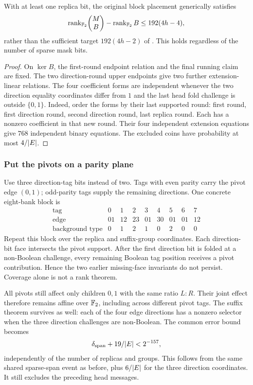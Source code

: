 \begin{proposition}
With at least one replica bit, the original block placement generically satisfies
\[
 \operatorname{rank}_{\mathbb{F}_2}\!\begin{pmatrix}M\\B\end{pmatrix}
 -\operatorname{rank}_{\mathbb{F}_2}B
 \le192(4h-4),
\]
rather than the sufficient target $192(4h-2)$ of . This holds regardless of the number of sparse mask bits.
\end{proposition}
\begin{proof}
On $\ker B$, the first-round endpoint relation and the final running claim are fixed. The two direction-round upper endpoints give two further extension-linear relations. The four coefficient forms are independent whenever the two direction equality coordinates differ from $1$ and the last head fold challenge is outside $\{0,1\}$. Indeed, order the forms by their last supported round: first round, first direction round, second direction round, last replica round. Each has a nonzero coefficient in that new round. Their four independent extension equations give $768$ independent binary equations. The excluded coins have probability at most $4/|E|$.
\end{proof}

\subsubsection{Put the pivots on a parity plane}

Use three direction-tag bits instead of two. Tags with even parity carry the pivot edge $(0,1)$; odd-parity tags supply the remaining directions. One concrete eight-bank block is
\[
\begin{array}{c|rrrrrrrr}
\text{tag}&0&1&2&3&4&5&6&7\\
\hline
\text{edge}&01&12&23&01&30&01&01&12\\
\text{background type}&0&1&2&1&0&2&0&0
\end{array}
\]
Repeat this block over the replica and suffix-group coordinates. Each direction-bit face intersects the pivot support. After the first direction bit is folded at a non-Boolean challenge, every remaining Boolean tag position receives a pivot contribution. Hence the two earlier missing-face invariants do not persist. Coverage alone is not a rank theorem.

All pivots still affect only children $0,1$ with the same ratio $L:R$. Their joint effect therefore remains affine over $\mathbb{F}_2$, including across different pivot tags. The suffix theorem survives as well: each of the four edge directions has a nonzero selector when the three direction challenges are non-Boolean. The common error bound becomes
\[
 \delta_{\mathrm{span}}+19/|E|<2^{-157},
\]
independently of the number of replicas and groups. This follows from the same shared sparse-span event as before, plus $6/|E|$ for the three direction coordinates. It still excludes the preceding head messages.

